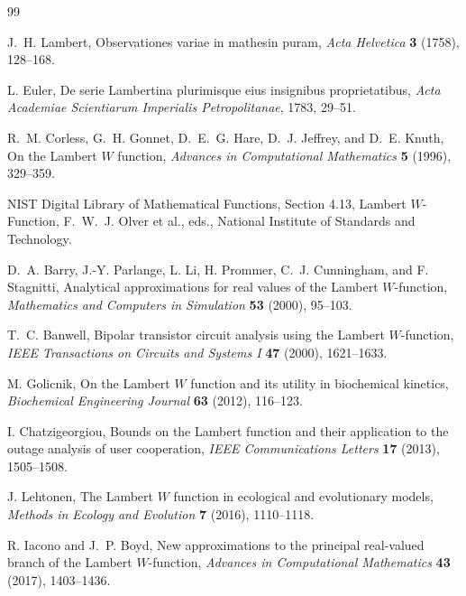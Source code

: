 \documentclass[11pt,oneside]{book}
\theoremstyle{definition}
\theoremstyle{remark}
\begin{document}
\begin{thebibliography}{99}

J.~H. Lambert,
\newblock Observationes variae in mathesin puram,
\newblock \emph{Acta Helvetica} \textbf{3} (1758), 128--168.

L. Euler,
\newblock De serie Lambertina plurimisque eius insignibus proprietatibus,
\newblock \emph{Acta Academiae Scientiarum Imperialis Petropolitanae},
1783, 29--51.

R.~M. Corless, G.~H. Gonnet, D.~E.~G. Hare, D.~J. Jeffrey, and D.~E. Knuth,
\newblock On the Lambert $W$ function,
\newblock \emph{Advances in Computational Mathematics} \textbf{5} (1996),
329--359.

NIST Digital Library of Mathematical Functions,
\newblock Section 4.13, Lambert $W$-Function,
\newblock F.~W.~J. Olver et al., eds., National Institute of Standards and
Technology.

D.~A. Barry, J.-Y. Parlange, L. Li, H. Prommer, C.~J. Cunningham, and
F. Stagnitti,
\newblock Analytical approximations for real values of the Lambert
$W$-function,
\newblock \emph{Mathematics and Computers in Simulation} \textbf{53} (2000),
95--103.

T.~C. Banwell,
\newblock Bipolar transistor circuit analysis using the Lambert $W$-function,
\newblock \emph{IEEE Transactions on Circuits and Systems I} \textbf{47}
(2000), 1621--1633.

M. Golicnik,
\newblock On the Lambert $W$ function and its utility in biochemical kinetics,
\newblock \emph{Biochemical Engineering Journal} \textbf{63} (2012),
116--123.

I. Chatzigeorgiou,
\newblock Bounds on the Lambert function and their application to the outage
analysis of user cooperation,
\newblock \emph{IEEE Communications Letters} \textbf{17} (2013), 1505--1508.

J. Lehtonen,
\newblock The Lambert $W$ function in ecological and evolutionary models,
\newblock \emph{Methods in Ecology and Evolution} \textbf{7} (2016),
1110--1118.

R. Iacono and J.~P. Boyd,
\newblock New approximations to the principal real-valued branch of the
Lambert $W$-function,
\newblock \emph{Advances in Computational Mathematics} \textbf{43} (2017),
1403--1436.


\end{thebibliography}
\end{document}
